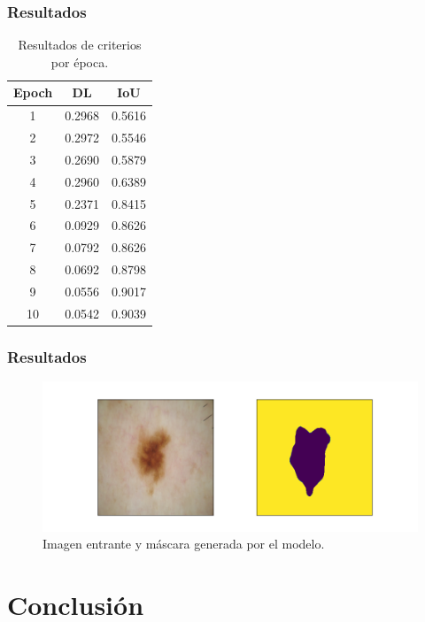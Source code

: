 \documentclass{beamer}
\begin{document}
\begin{frame}
    \frametitle{Resultados}

    \begin{table}
        \centering
        \caption{Resultados de criterios por época.}
        \begin{tabular}{c c c}
          \toprule
          \textbf{Epoch} & \textbf{DL} & \textbf{IoU} \\
          \midrule
          1 & 0.2968 & 0.5616 \\
          2 & 0.2972 & 0.5546 \\
          3 & 0.2690 & 0.5879 \\
          4 & 0.2960 & 0.6389 \\
          5 & 0.2371 & 0.8415 \\
          6 & 0.0929 & 0.8626 \\
          7 & 0.0792 & 0.8626 \\
          8 & 0.0692 & 0.8798 \\
          9 & 0.0556 & 0.9017 \\
          10 & 0.0542 & 0.9039 \\
          \bottomrule
          
        \end{tabular}
        \label{table:summary}
      \end{table}
\end{frame}

\begin{frame}
    \frametitle{Resultados}
    \begin{figure}
        \centering
        \includegraphics[scale=0.4]{Figure_1.png}
        \caption{Imagen entrante y máscara generada por el modelo.}
    \end{figure}
\end{frame}

\section{Conclusión}
\end{document}
